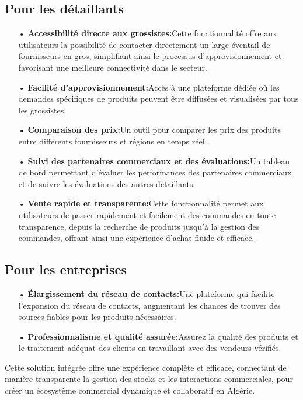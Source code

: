 \documentclass[edit,12pt,a4paper,ChapStyle,oneside,doubleinterligne]{report}
\begin{document}
\subsection{Pour les détaillants}
\begin{itemize}
    \item [•] \textbf{Accessibilité directe aux grossistes:}Cette fonctionnalité offre aux utilisateurs la possibilité de contacter directement un large éventail de fournisseurs en gros, simplifiant ainsi le processus d'approvisionnement et favorisant une meilleure connectivité dans le secteur.
    \item [•] \textbf{Facilité d'approvisionnement:}Accès à une plateforme dédiée où les demandes spécifiques de produits peuvent être diffusées et visualisées par tous les grossistes.
    \item [•] \textbf{Comparaison des prix:}Un outil pour comparer les prix des produits entre différents fournisseurs et régions en temps réel.
    \item [•] \textbf{Suivi des partenaires commerciaux et des évaluations:}Un tableau de bord permettant d'évaluer les performances des partenaires commerciaux et de suivre les évaluations des autres détaillants.
    \item [•] \textbf{Vente rapide et transparente:}Cette fonctionnalité permet aux utilisateurs de passer rapidement et facilement des commandes en toute transparence, depuis la recherche de produits jusqu'à la gestion des commandes, offrant ainsi une expérience d'achat fluide et efficace.
\end{itemize}
\subsection{Pour les entreprises}
\begin{itemize}
    \item [•] \textbf{Élargissement du réseau de contacts:}Une plateforme qui facilite l'expansion du réseau de contacts, augmentant les chances de trouver des sources fiables pour les produits nécessaires.
    \item [•] \textbf{Professionnalisme et qualité assurée:}Assurez la qualité des produits et le traitement adéquat des clients en travaillant avec des vendeurs vérifiés.
\end{itemize}
\phantom{hassane}
\newline
Cette solution intégrée offre une expérience complète et efficace, connectant de manière transparente la gestion des stocks et les interactions commerciales, pour créer un écosystème commercial dynamique et collaboratif en Algérie.
\end{document}

